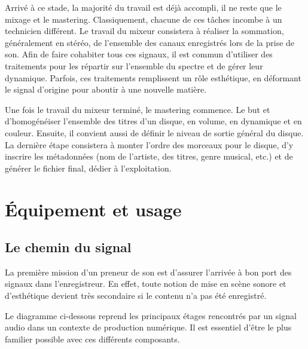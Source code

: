 \documentclass[
]{book}
\begin{document}
Arrivé à ce stade, la majorité du travail est déjà accompli, il ne reste que le mixage et le mastering. Classiquement, chacune de ces tâches incombe à un technicien différent. Le travail du mixeur consistera à réaliser la sommation, généralement en stéréo, de l'ensemble des canaux enregistrés lors de la prise de son. Afin de faire cohabiter tous ces signaux, il est commun d'utiliser des traitements pour les répartir sur l'ensemble du spectre et de gérer leur dynamique. Parfois, ces traitements remplissent un rôle esthétique, en déformant le signal d'origine pour aboutir à une nouvelle matière.

Une fois le travail du mixeur terminé, le mastering commence. Le but et d'homogénéiser l'ensemble des titres d'un disque, en volume, en dynamique et en couleur. Ensuite, il convient aussi de définir le niveau de sortie général du disque. La dernière étape consistera à monter l'ordre des morceaux pour le disque, d'y inscrire les métadonnées (nom de l'artiste, des titres, genre musical, etc.) et de générer le fichier final, dédier à l'exploitation.

\hypertarget{part-uxe9quipement-et-usage}{%
\part{Équipement et usage}\label{part-uxe9quipement-et-usage}}

\hypertarget{le-chemin-du-signal}{%
\chapter{Le chemin du signal}\label{le-chemin-du-signal}}

La première mission d'un preneur de son est d'assurer l'arrivée à bon port des signaux dans l'enregistreur. En effet, toute notion de mise en scène sonore et d'esthétique devient très secondaire si le contenu n'a pas été enregistré.

Le diagramme ci-dessous reprend les principaux étages rencontrés par un signal audio dans un contexte de production numérique. Il est essentiel d'être le plus familier possible avec ces différents composants.
\end{document}
